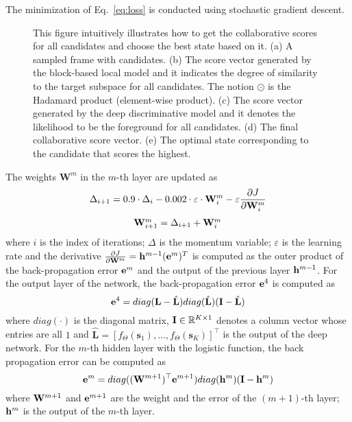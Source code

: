 \documentclass[preprint,12pt,review]{elsarticle}
\begin{document}
The minimization of Eq.~\ref{eq:loss} is conducted using stochastic gradient descent.
\begin{figure*}[tbp]
\centering
{}
\vspace{-8mm}
\caption{This figure intuitively illustrates how to get the collaborative scores for all candidates and choose the best state based on it. (a) A sampled frame with candidates. (b) The score vector generated by the block-based local model and it indicates the degree of similarity to the target subspace for all candidates.  The notion $ \odot $ is the Hadamard product (element-wise product). (c) The score vector generated by the deep discriminative model and it denotes the likelihood to be the foreground for all candidates. (d) The final collaborative score vector. (e) The optimal state corresponding to the candidate that scores the highest.}
\label{fig:collaborative model}
\end{figure*}
The weights $\mathbf{W}^m$ in the $m$-th layer are updated as
\begin{equation} \label{eq:weightupdate1}
{\Delta _{i + 1}} = 0.9\cdot{\Delta _i} - 0.002\cdot\varepsilon \cdot{\bf{W}}_i^m - \varepsilon \frac{{\partial J}}{{\partial {\bf{W}}_i^m}}
\end{equation}
\begin{equation} \label{eq:weightupdate2}
\begin{array}{l}
{\bf{W}}_{i + 1}^m = {\Delta _{i + 1}} + {\bf{W}}_i^m\\
\end{array}
\end{equation}
where $i$ is the index of iterations; $\Delta $ is the momentum variable; $\varepsilon$ is the learning rate and the derivative $\frac{{\partial J}}{{\partial {{\bf{W}}^m}}} = {{\bf{h}}^{m - 1}}{({{\bf{e}}^m})^T} $  is computed as the outer product of the back-propagation error ${{\bf{e}}^m}$ and the output of the previous layer ${{\bf{h}}^{m - 1}}$.
For the output layer of the network, the back-propagation error ${{\bf{e}}^4}$ is computed as
\begin{equation}{{\bf{e}}^4} = diag({\bf{L}}  - {\hat{\bf{L}}})diag(\hat{\bf{L}})({\bf{I}} - \hat{\bf{L}})\mathbb{}
\end{equation}
where $diag( \cdot )$ is the diagonal matrix, ${\bf{I}} \in \mathbb{R}^{K\times 1}$
denotes a column vector whose entries are all $1$ and $\hat{\mathbf{L}} = [f_{\Theta}(\mathbf{s}_1),\ldots,f_{\Theta}(\mathbf{s}_K)]^{\top}$ is the output of the deep network.
For the $m$-th hidden layer with the logistic function, the back propagation error can be computed as
\begin{equation}{{\bf{e}}^m} = diag({({\bf{W}}^{m +1})^{\top}}{{\bf{e}}^{m + 1}})diag({{\bf{h}}^m})({\bf{I}} - {{\bf{h}}^m})
\end{equation}
where ${{\bf{W}}^{m + 1}}$ and ${{\bf{e}}^{m + 1}}$ are the weight and the error of the $(m+1)$-th layer; ${{\bf{h}}^m}$ is the output of the $m$-th layer.
\end{document}
